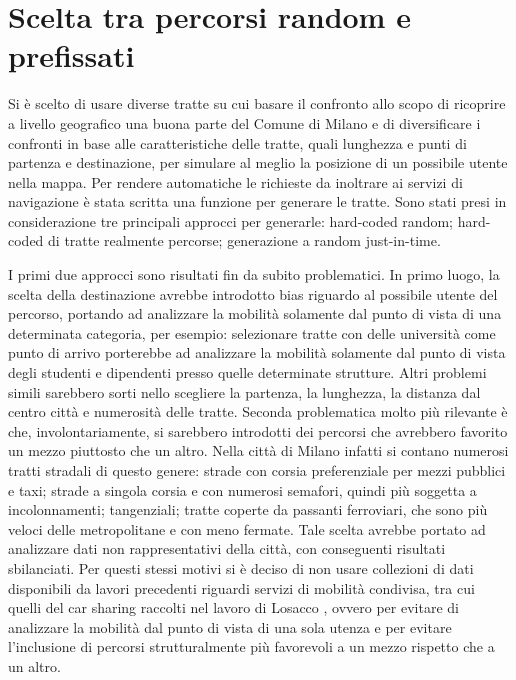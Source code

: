 \section{Scelta tra percorsi random e prefissati}

Si è scelto di usare diverse tratte su cui basare il confronto allo scopo di ricoprire a livello geografico una buona parte del Comune di Milano e di diversificare i confronti in base alle caratteristiche delle tratte, quali lunghezza e punti di partenza e destinazione, per simulare al meglio la posizione di un possibile utente nella mappa. Per rendere automatiche le richieste da inoltrare ai servizi di navigazione è stata scritta una funzione per generare le tratte. Sono stati presi in considerazione tre principali approcci per generarle: hard-coded random; hard-coded di tratte realmente percorse; generazione a random just-in-time.

I primi due approcci sono risultati fin da subito problematici. In primo luogo, la scelta della destinazione avrebbe introdotto bias riguardo al possibile utente del percorso, portando ad analizzare la mobilità solamente dal punto di vista di una determinata categoria, per esempio: selezionare tratte con delle università come punto di arrivo porterebbe ad analizzare la mobilità solamente dal punto di vista degli studenti e dipendenti presso quelle determinate strutture. Altri problemi simili sarebbero sorti nello scegliere la partenza, la lunghezza, la distanza dal centro città e numerosità delle tratte. Seconda problematica molto più rilevante è che, involontariamente, si sarebbero introdotti dei percorsi che avrebbero favorito un mezzo piuttosto che un altro. Nella città di Milano infatti si contano numerosi tratti stradali di questo genere: strade con corsia preferenziale per mezzi pubblici e taxi; strade a singola corsia e con numerosi semafori, quindi più soggetta a incolonnamenti; tangenziali; tratte coperte da passanti ferroviari, che sono più veloci delle metropolitane e con meno fermate. Tale scelta avrebbe portato ad analizzare dati non rappresentativi della città, con conseguenti risultati sbilanciati. Per questi stessi motivi si è deciso di non usare collezioni di dati disponibili da lavori precedenti riguardi servizi di mobilità condivisa, tra cui quelli del car sharing raccolti nel lavoro di Losacco \cite{trentini2017sampling}, ovvero per evitare di analizzare la mobilità dal punto di vista di una sola utenza e per evitare l'inclusione di percorsi strutturalmente più favorevoli a un mezzo rispetto che a un altro.

